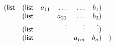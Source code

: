 \documentclass[11pt]{article}
\begin{document}
\[
\begin{array}{llrrrrr}
({\sf list} & ({\sf list} & a_{11} & \ldots &  \ldots &  b_1) \\
            & ({\sf list} &        & a_{21} &  \ldots &  b_2)  \\
	    & ({\sf list} &        & \vdots &  \vdots &  \vdots)  \\
            & ({\sf list} &        &        &  a_{nn} &  b_n) & ) \\
\end{array}
\]
\end{document}
